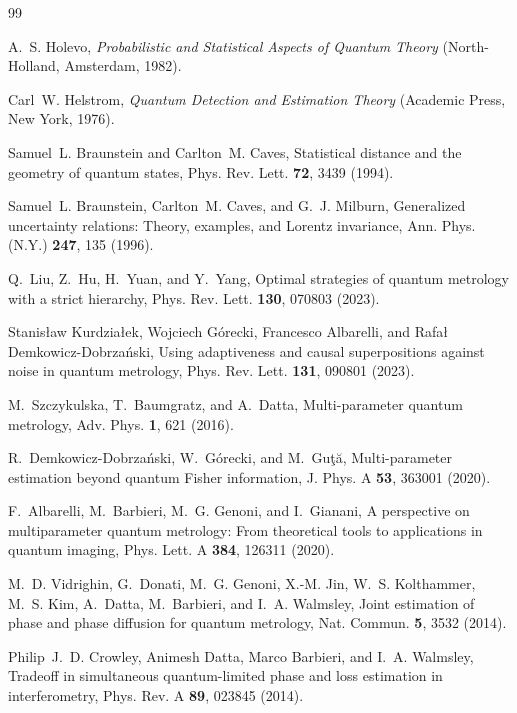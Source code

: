 \documentclass[
aps,
prl,
twocolumn,

superscriptaddress]{revtex4-2}
\begin{document}
\begin{thebibliography}{99}

A.~S. Holevo, \textit{Probabilistic and Statistical Aspects of Quantum Theory}
(North-Holland, Amsterdam, 1982).

Carl~W. Helstrom, \textit{Quantum Detection and Estimation Theory}
(Academic Press, New York, 1976).

Samuel~L. Braunstein and Carlton~M. Caves, Statistical distance and the geometry
of quantum states, Phys. Rev. Lett. \textbf{72}, 3439 (1994).

Samuel~L. Braunstein, Carlton~M. Caves, and G.~J. Milburn, Generalized
uncertainty relations: Theory, examples, and Lorentz invariance, Ann. Phys.
(N.Y.) \textbf{247}, 135 (1996).

Q.~Liu, Z.~Hu, H.~Yuan, and Y.~Yang, Optimal strategies of quantum metrology
with a strict hierarchy, Phys. Rev. Lett. \textbf{130}, 070803 (2023).

Stanis{\l}aw Kurdzia{\l}ek, Wojciech G{\'o}recki, Francesco Albarelli, and
Rafa{\l} Demkowicz-Dobrza{\'n}ski, Using adaptiveness and causal superpositions
against noise in quantum metrology, Phys. Rev. Lett. \textbf{131}, 090801
(2023).

M.~Szczykulska, T.~Baumgratz, and A.~Datta, Multi-parameter quantum metrology,
Adv. Phys. \textbf{1}, 621 (2016).

R.~Demkowicz-Dobrza{\'n}ski, W.~G{\'o}recki, and M.~Gu\c{t}\u{a},
Multi-parameter estimation beyond quantum Fisher information, J. Phys. A
\textbf{53}, 363001 (2020).

F.~Albarelli, M.~Barbieri, M.~G. Genoni, and I.~Gianani, A perspective on
multiparameter quantum metrology: From theoretical tools to applications in
quantum imaging, Phys. Lett. A \textbf{384}, 126311 (2020).

M.~D. Vidrighin, G.~Donati, M.~G. Genoni, X.-M. Jin, W.~S. Kolthammer,
M.~S. Kim, A.~Datta, M.~Barbieri, and I.~A. Walmsley, Joint estimation of
phase and phase diffusion for quantum metrology, Nat. Commun. \textbf{5}, 3532
(2014).

Philip~J.~D. Crowley, Animesh Datta, Marco Barbieri, and I.~A. Walmsley,
Tradeoff in simultaneous quantum-limited phase and loss estimation in
interferometry, Phys. Rev. A \textbf{89}, 023845 (2014).


\end{thebibliography}
\end{document}
